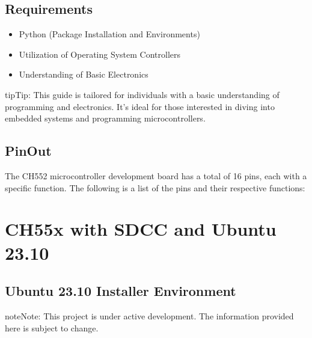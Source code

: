 \documentclass[letterpaper,10pt,english]{sphinxmanual}
\begin{document}
\section{Requirements}
\label{\detokenize{about:requirements}}\begin{itemize}
\item {} 
\sphinxAtStartPar
Python (Package Installation and Environments)

\item {} 
\sphinxAtStartPar
Utilization of Operating System Controllers

\item {} 
\sphinxAtStartPar
Understanding of Basic Electronics

\end{itemize}

\begin{sphinxadmonition}{tip}{Tip:}
\sphinxAtStartPar
This  guide is tailored for individuals with a basic understanding of programming and electronics. It’s ideal for those interested in diving into embedded systems and programming microcontrollers.
\end{sphinxadmonition}


\section{PinOut}
\label{\detokenize{about:pinout}}
\sphinxAtStartPar
The CH552 microcontroller development board has a total of 16 pins, each with a specific function. The following is a list of the pins and their respective functions:


\sphinxstepscope


\chapter{CH55x with SDCC and Ubuntu 23.10}
\label{\detokenize{install_linux:ch55x-with-sdcc-and-ubuntu-23-10}}\label{\detokenize{install_linux::doc}}

\section{Ubuntu 23.10 Installer Environment}
\label{\detokenize{install_linux:ubuntu-23-10-installer-environment}}
\begin{sphinxadmonition}{note}{Note:}
\sphinxAtStartPar
This project is under active development. The information provided here is subject to change.
\end{sphinxadmonition}
\end{document}
